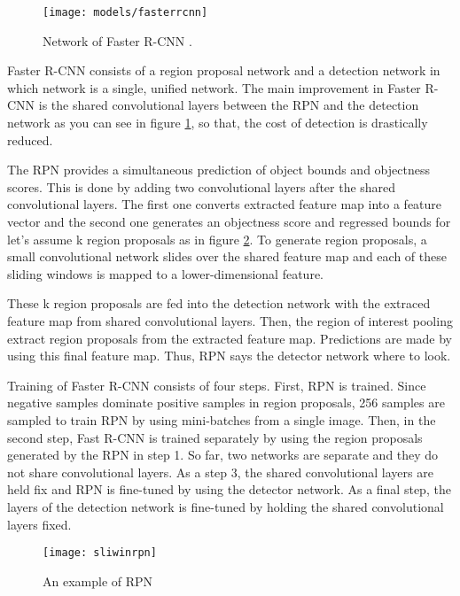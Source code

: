\documentclass{article}
\begin{document}
\setlength{\parindent}{6ex}

\begin{figure}
    \centering
    \texttt{[image: models/fasterrcnn]}
    \caption{Network of Faster R-CNN \cite{fasterrcnncite}. 
    }
    \label{fig:fasterrcnn1}
\end{figure}

\indent

Faster R-CNN \cite{fasterrcnncite} consists of a region proposal network and a detection network in which 
network is a single, unified network. 
The main improvement in Faster R-CNN is the shared convolutional layers between 
the RPN and the detection network as you can see in figure \ref{fig:fasterrcnn1}, so that, the cost of 
detection is drastically reduced. \par

The RPN provides a simultaneous prediction of object bounds and 
objectness scores. This is done by adding two convolutional layers after the 
shared convolutional layers. The first one converts extracted feature map into a 
feature vector and the second one generates an objectness score and regressed 
bounds for let's assume k region proposals as in figure \ref{fig:sliwinrpn1}. To 
generate region proposals, a small convolutional network slides over the shared 
feature map and each of these sliding windows is mapped to a lower-dimensional 
feature. \par

These k region proposals are fed into the detection network with the extraced feature 
map from shared convolutional layers. Then, the region of interest pooling extract 
region proposals from the extracted feature map. Predictions are made by using this 
final feature map. Thus, RPN says the detector network where to look. \par

Training of Faster R-CNN consists of four steps. First, RPN is trained. Since 
negative samples dominate positive samples in region proposals, 256 samples are 
sampled to train RPN by using mini-batches from a single image. Then, in the 
second step, Fast R-CNN is trained separately by using the region proposals 
generated by the RPN in step 1. So far, two networks are separate and they do 
not share convolutional layers. As a step 3, the shared convolutional layers are 
held fix and RPN is fine-tuned by using the detector network. As a final step, the 
layers of the detection network is fine-tuned by holding the shared convolutional layers 
fixed.
\begin{figure}
    \centering
    \texttt{[image: sliwinrpn]}
    \caption{An example of RPN \cite{fasterrcnncite}}
    \label{fig:sliwinrpn1}
\end{figure}
\end{document}
